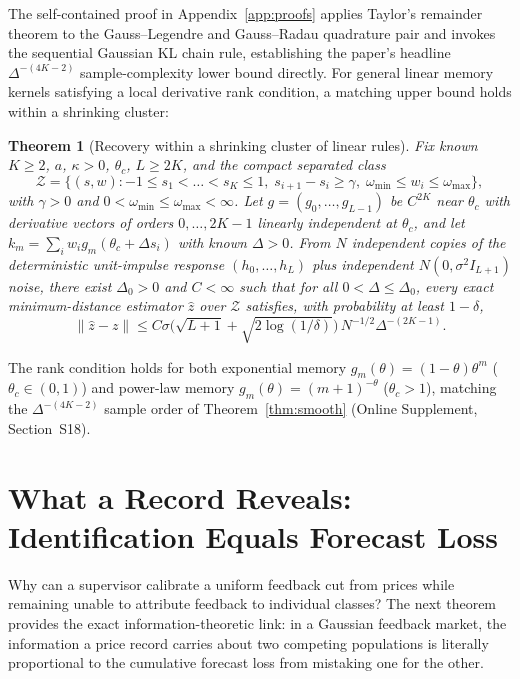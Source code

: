 \documentclass[11pt,letterpaper]{article}
\newtheorem{theorem}{Theorem}[section]
\theoremstyle{definition}
\begin{document}
The self-contained proof in Appendix~\ref{app:proofs} applies Taylor's remainder theorem to the Gauss--Legendre and Gauss--Radau quadrature pair and invokes the sequential Gaussian KL chain rule, establishing the paper's headline $\Delta^{-(4K-2)}$ sample-complexity lower bound directly. For general linear memory kernels satisfying a local derivative rank condition, a matching upper bound holds within a shrinking cluster:

\begin{theorem}[Recovery within a shrinking cluster of linear rules]\label{thm:recovery}
Fix known $K \ge 2$, $a$, $\kappa > 0$, $\theta_c$, $L \ge 2K$, and the compact separated class
\[
  \mathcal{Z} = \{(s, w) : -1 \le s_1 < \dots < s_K \le 1,\; s_{i+1} - s_i \ge \gamma,\; \omega_{\min} \le w_i \le \omega_{\max}\},
\]
with $\gamma > 0$ and $0 < \omega_{\min} \le \omega_{\max} < \infty$. Let $g = (g_0, \dots, g_{L-1})$ be $C^{2K}$ near $\theta_c$ with derivative vectors of orders $0, \dots, 2K-1$ linearly independent at $\theta_c$, and let $k_m = \sum_i w_i g_m(\theta_c + \Delta s_i)$ with known $\Delta > 0$. From $N$ independent copies of the deterministic unit-impulse response $(h_0, \dots, h_L)$ plus independent $N(0, \sigma^2 I_{L+1})$ noise, there exist $\Delta_0 > 0$ and $C < \infty$ such that for all $0 < \Delta \le \Delta_0$, every exact minimum-distance estimator $\hat{z}$ over $\mathcal{Z}$ satisfies, with probability at least $1 - \delta$,
\[
  \|\hat{z} - z\| \le C \sigma \bigl(\sqrt{L+1} + \sqrt{2\log(1/\delta)}\bigr)\, N^{-1/2} \Delta^{-(2K-1)}.
\]
\end{theorem}

The rank condition holds for both exponential memory $g_m(\theta) = (1-\theta)\theta^m$ ($\theta_c \in (0,1)$) and power-law memory $g_m(\theta) = (m+1)^{-\theta}$ ($\theta_c > 1$), matching the $\Delta^{-(4K-2)}$ sample order of Theorem~\ref{thm:smooth} (Online Supplement, Section~S18).

\section{What a Record Reveals: Identification Equals Forecast Loss}\label{sec:forecast}

Why can a supervisor calibrate a uniform feedback cut from prices while remaining unable to attribute feedback to individual classes? The next theorem provides the exact information-theoretic link: in a Gaussian feedback market, the information a price record carries about two competing populations is literally proportional to the cumulative forecast loss from mistaking one for the other.
\end{document}
